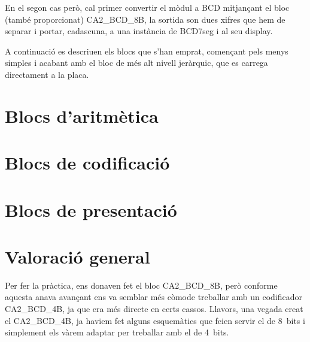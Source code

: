 En el segon cas però, cal primer convertir el mòdul a BCD
mitjançant el bloc (també proporcionat) \textsf{CA2\_BCD\_8B}, la sortida son dues
xifres que hem de separar i portar, cadascuna, a una instància de \textsf{BCD7seg}
i al seu display.

A continuació es descriuen els blocs que s'han emprat, començant pels menys
simples i acabant amb el bloc de més alt nivell jeràrquic, que es carrega
directament a la placa.

  \cclearpage
\section{Blocs d'aritmètica}
  \cclearpage
{}
  \cclearpage
{}
  \cclearpage
{}
  \cclearpage
{}
  \cclearpage
{}

  \cclearpage
\section{Blocs de codificació}
  \cclearpage
{}
  \cclearpage
{}

  \cclearpage
\section{Blocs de presentació}
  \cclearpage
{}
  \cclearpage
{}
  \cclearpage
{}
  \cclearpage
{}

\section{Valoració general}

Per fer la pràctica, ens donaven fet el bloc \textsf{CA2\_BCD\_8B}, però conforme aquesta anava avançant ens va semblar més còmode treballar amb un codificador \textsf{CA2\_BCD\_4B}, ja que era més directe en certs cassos. Llavors, una vegada creat el \textsf{CA2\_BCD\_4B}, ja haviem fet alguns esquemàtics que feien servir el de 8~bits i simplement els vàrem adaptar per treballar amb el de 4~bits.

